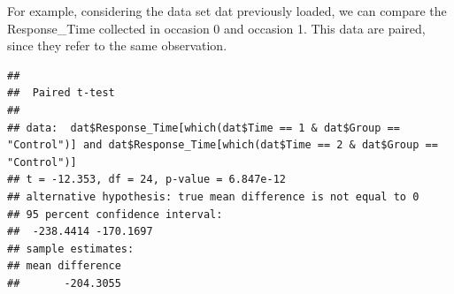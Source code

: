 \documentclass[
]{article}
\newenvironment{Shaded}{\begin{snugshade}}{\end{snugshade}}
\newcommand{\AttributeTok}[1]{\textcolor[rgb]{0.13,0.29,0.53}{#1}}
\newcommand{\ConstantTok}[1]{\textcolor[rgb]{0.56,0.35,0.01}{#1}}
\newcommand{\DecValTok}[1]{\textcolor[rgb]{0.00,0.00,0.81}{#1}}
\newcommand{\FloatTok}[1]{\textcolor[rgb]{0.00,0.00,0.81}{#1}}
\newcommand{\FunctionTok}[1]{\textcolor[rgb]{0.13,0.29,0.53}{\textbf{#1}}}
\newcommand{\NormalTok}[1]{#1}
\newcommand{\SpecialCharTok}[1]{\textcolor[rgb]{0.81,0.36,0.00}{\textbf{#1}}}
\newcommand{\StringTok}[1]{\textcolor[rgb]{0.31,0.60,0.02}{#1}}
\begin{document}
For example, considering the data set dat previously loaded, we can
compare the Response\_Time collected in occasion 0 and occasion 1. This
data are paired, since they refer to the same observation.

\begin{Shaded}
\end{Shaded}

\begin{verbatim}
## 
##  Paired t-test
## 
## data:  dat$Response_Time[which(dat$Time == 1 & dat$Group == "Control")] and dat$Response_Time[which(dat$Time == 2 & dat$Group == "Control")]
## t = -12.353, df = 24, p-value = 6.847e-12
## alternative hypothesis: true mean difference is not equal to 0
## 95 percent confidence interval:
##  -238.4414 -170.1697
## sample estimates:
## mean difference 
##       -204.3055
\end{verbatim}
\end{document}
